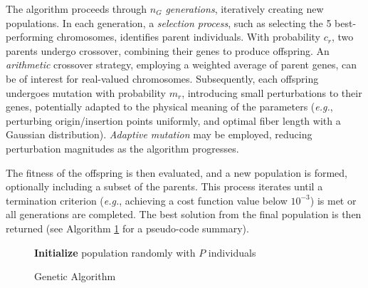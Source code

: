 The algorithm proceeds through $n_G$ \emph{generations}, iteratively creating new populations. In each generation, a \emph{selection process}, such as selecting the 5 best-performing chromosomes, identifies parent individuals. With probability $c_r$, two parents undergo crossover, combining their genes to produce offspring. An \emph{arithmetic} crossover strategy, employing a weighted average of parent genes, can be of interest for real-valued chromosomes. Subsequently, each offspring undergoes mutation with probability $m_r$, introducing small perturbations to their genes, potentially adapted to the physical meaning of the parameters (\emph{e.g.},  perturbing origin/insertion points uniformly, and optimal fiber length with a Gaussian distribution). \emph{Adaptive mutation} may be employed, reducing perturbation magnitudes as the algorithm progresses.

The fitness of the offspring is then evaluated, and a new population is formed, optionally including a subset of the parents. This process iterates until a termination criterion (\emph{e.g.}, achieving a cost function value below $10^{-3}$) is met or all generations are completed. The best solution from the final population is then returned (see Algorithm \ref{alg:genetic_algorithm} for a pseudo-code summary).

\begin{figure}[!ht]
    \centering
    \begin{minipage}{1.0\linewidth}
        \begin{algorithm}[H]
            \SetAlgoLined
            
            \BlankLine
            
            \textbf{Initialize} population randomly with $P$ individuals\;
            
            \caption{Genetic Algorithm}
            \label{alg:genetic_algorithm}
        \end{algorithm}
    \end{minipage}
\end{figure}

